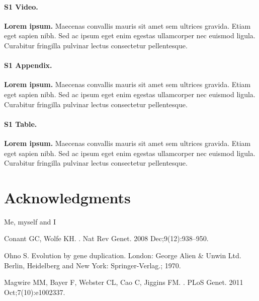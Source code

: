 \documentclass[10pt,letterpaper]{article}
\begin{document}
\paragraph*{S1 Video.}
\label{S1_Video}
{\bf Lorem ipsum.}  Maecenas convallis mauris sit amet sem ultrices gravida. Etiam eget sapien nibh. Sed ac ipsum eget enim egestas ullamcorper nec euismod ligula. Curabitur fringilla pulvinar lectus consectetur pellentesque.

\paragraph*{S1 Appendix.}
\label{S1_Appendix}
{\bf Lorem ipsum.} Maecenas convallis mauris sit amet sem ultrices gravida. Etiam eget sapien nibh. Sed ac ipsum eget enim egestas ullamcorper nec euismod ligula. Curabitur fringilla pulvinar lectus consectetur pellentesque.

\paragraph*{S1 Table.}
\label{S1_Table}
{\bf Lorem ipsum.} Maecenas convallis mauris sit amet sem ultrices gravida. Etiam eget sapien nibh. Sed ac ipsum eget enim egestas ullamcorper nec euismod ligula. Curabitur fringilla pulvinar lectus consectetur pellentesque.

\section*{Acknowledgments}
Me, myself and I

\nolinenumbers

%
%
% 
\begin{thebibliography}{10}

Conant GC, Wolfe KH.
.
\newblock Nat Rev Genet. 2008 Dec;9(12):938--950.

Ohno S.
\newblock Evolution by gene duplication.
\newblock London: George Alien \& Unwin Ltd. Berlin, Heidelberg and New York:
  Springer-Verlag.; 1970.

Magwire MM, Bayer F, Webster CL, Cao C, Jiggins FM.
.
\newblock PLoS Genet. 2011 Oct;7(10):e1002337.

\end{thebibliography}
\end{document}
